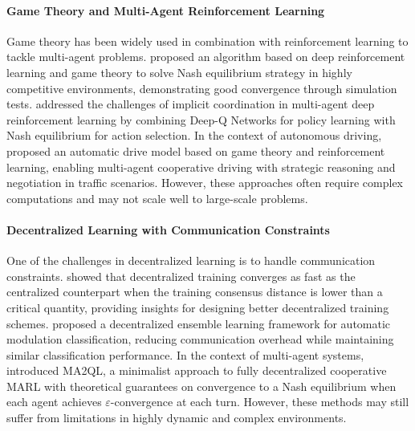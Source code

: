 \paragraph{Game Theory and Multi-Agent Reinforcement Learning}
Game theory has been widely used in combination with reinforcement learning to tackle multi-agent problems. \citet{yin2022air} proposed an algorithm based on deep reinforcement learning and game theory to solve Nash equilibrium strategy in highly competitive environments, demonstrating good convergence through simulation tests. \citet{adams2020resolving} addressed the challenges of implicit coordination in multi-agent deep reinforcement learning by combining Deep-Q Networks for policy learning with Nash equilibrium for action selection. In the context of autonomous driving, \citet{duan2022autonomous} proposed an automatic drive model based on game theory and reinforcement learning, enabling multi-agent cooperative driving with strategic reasoning and negotiation in traffic scenarios. However, these approaches often require complex computations and may not scale well to large-scale problems.

\paragraph{Decentralized Learning with Communication Constraints}
One of the challenges in decentralized learning is to handle communication constraints. \citet{kong2021consensus} showed that decentralized training converges as fast as the centralized counterpart when the training consensus distance is lower than a critical quantity, providing insights for designing better decentralized training schemes. \citet{fu2022automatic} proposed a decentralized ensemble learning framework for automatic modulation classification, reducing communication overhead while maintaining similar classification performance. In the context of multi-agent systems, \citet{su2022ma2ql} introduced MA2QL, a minimalist approach to fully decentralized cooperative MARL with theoretical guarantees on convergence to a Nash equilibrium when each agent achieves $\varepsilon$-convergence at each turn. However, these methods may still suffer from limitations in highly dynamic and complex environments.

